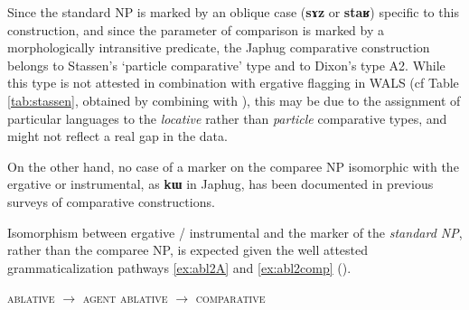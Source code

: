 \documentclass[oldfontcommands,oneside,a4paper,11pt]{article}
\newcommand{\ipa}[1]{{\phon\textbf{#1}}}
\begin{document}
Since the standard NP is marked by an oblique case (\ipa{sɤz} or \ipa{staʁ}) specific to this construction, and since the parameter of comparison is marked by a morphologically intransitive predicate, the Japhug comparative construction belongs to Stassen's  \citeyearpar{stassen11comparative} `particle comparative' type and to Dixon's \citeyearpar[789]{dixon08comparative} type A2.  While this type is not attested in combination with  ergative flagging in WALS (cf Table \ref{tab:stassen}, obtained by combining \citealt{stassen11comparative} with \citealt{comrie11case}), this may be due to the assignment of particular languages to the \textit{locative} rather than \textit{particle}  comparative types, and might not reflect a real gap in the data.

On the other hand, no case of a marker   on the comparee NP isomorphic with the ergative or instrumental, as \ipa{kɯ} in Japhug, has been documented in   previous surveys of comparative constructions.

\begin{table}[h]
\caption{Combination of chapters 98 (Alignment of Case Marking of Full Nouns) and 121 (Comparative constructions) of the WALS} \label{tab:stassen}
\end{table}
 
Isomorphism between ergative / instrumental and the marker of the \textit{standard NP}, rather than the comparee NP, is expected given the well attested grammaticalization pathways \ref{ex:abl2A} and \ref{ex:abl2comp} (\citealt[29]{heine-kuteva02}).
 


\begin{exe}
\ex \label{ex:abl2A}
\glt \textsc{ablative} $\rightarrow$ \textsc{agent} 
\ex \label{ex:abl2comp}
\glt \textsc{ablative} $\rightarrow$ \textsc{comparative}
\end{exe}
\end{document}
